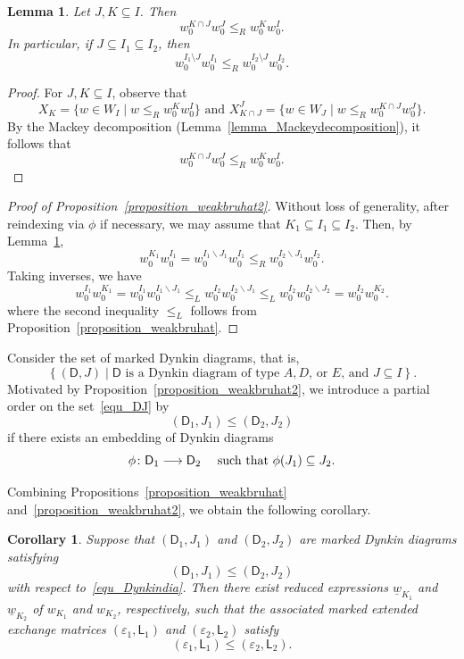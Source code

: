 \documentclass[11pt]{amsart}
\numberwithin{equation}{section}
\theoremstyle{plain}
\newtheorem{corollary}[theorem]{Corollary}
\newtheorem{lemma}[theorem]{Lemma}
\theoremstyle{definition}
\def\to{\mathchoice{\longrightarrow}{\rightarrow}{\rightarrow}{\rightarrow}}
\numberwithin{equation}{section}
\begin{document}
\begin{lemma}\label{lemma_conseqMackey}
Let $J, K \subseteq I$. Then
$$
w_0^{K \cap J} w_0^J   \leq_R w_0^{K} w_0^I .
$$
In particular, if $J \subseteq I_1 \subseteq I_2$, then
$$
w_0^{I_1 \setminus J}  w_0^{I_1}  \leq_R w_0^{I_2 \setminus J}w_0^{I_2}.
$$
\end{lemma}

\begin{proof}
For $J,K \subseteq I$, observe that
$$
X_K = \bigl\{ w \in W_I \mid w \leq_R  w_0^K w_0^I \bigr\} \mbox{ and } X^J_{K \cap J} = \bigl\{ w \in W_J \mid w \leq_R w_0^{K \cap J} w_0^J \bigr\}.
$$
By the Mackey decomposition (Lemma~\ref{lemma_Mackeydecomposition}), it follows that 
$$
w_0^{K \cap J} w_0^J   \leq_R w_0^{K} w_0^I.
$$
\end{proof}

\begin{proof}[Proof of Proposition~\ref{proposition_weakbruhat2}]
Without loss of generality, after reindexing via $\phi$ if necessary, we may assume that $K_1 \subseteq I_1 \subseteq I_2$. Then, by Lemma~\ref{lemma_conseqMackey},
$$
w_0^{K_1} w_0^{I_1} = w_0^{I_1 \backslash J_1} w_0^{I_1} \leq_R w_0^{I_2 \backslash J_1} w_0^{I_2}.
$$
Taking inverses, we have
$$
w_0^{I_1} w_0^{K_1} = w_0^{I_1} w_0^{I_1 \backslash J_1}  \leq_L  w_0^{I_2} w_0^{I_2 \backslash J_1} \leq_L  w_0^{I_2} w_0^{I_2 \backslash J_2} = w_0^{I_2} w_0^{K_2}. 
$$
where the second inequality $\leq_L$ follows from Proposition~\ref{proposition_weakbruhat}.
\end{proof}

Consider the set of marked Dynkin diagrams, that is, 
\begin{equation}\label{equ_DJ}
\left\{ (\mathsf{D}, J) \mid \mbox{$\mathsf{D}$ is a Dynkin diagram of type $A, D$, or $E$, and $J \subseteq I$} \right\}.
\end{equation}
Motivated by Proposition~\ref{proposition_weakbruhat2}, we introduce a partial order on the set~\eqref{equ_DJ} by
\begin{equation}\label{equ_Dynkindia}
(\mathsf{D}_1, J_1) \leq (\mathsf{D}_2, J_2) 
\end{equation}
if there exists an embedding of Dynkin diagrams
$$
\phi \colon \mathsf{D}_1 \to \mathsf{D}_2 \quad \mbox{ such that $\phi(J_1) \subseteq J_2$}.
$$

Combining Propositions~\ref{proposition_weakbruhat} and~\ref{proposition_weakbruhat2}, we obtain the following corollary.

\begin{corollary}\label{corollary_Dynkin2}
Suppose that $(\mathsf{D}_1, J_1)$ and $(\mathsf{D}_2, J_2)$ are marked Dynkin diagrams satisfying
$$
(\mathsf{D}_1, J_1) \leq (\mathsf{D}_2, J_2)
$$ 
with respect to~\eqref{equ_Dynkindia}. Then there exist reduced expressions $\underline{w}_{K_1}$ and $\underline{w}_{K_2}$ of $w_{K_1}$ and $w_{K_2}$, respectively, such that the associated marked extended exchange matrices $(\varepsilon_1, \mathsf{L}_1)$ and $(\varepsilon_2, \mathsf{L}_2)$ satisfy
$$
(\varepsilon_1, \mathsf{L}_1) \leq (\varepsilon_2, \mathsf{L}_2).
$$
\end{corollary}
\end{document}
